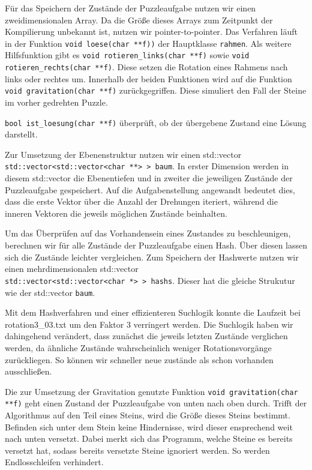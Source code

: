 	Für das Speichern der Zustände der Puzzleaufgabe nutzen wir einen zweidimensionalen Array.
	Da die Größe dieses Arrays zum Zeitpunkt der Kompilierung unbekannt ist, nutzen wir pointer-to-pointer.
	Das Verfahren läuft in der Funktion \texttt{void loese(char **f))} der Hauptklasse \texttt{rahmen}.
	Als weitere Hilfsfunktion gibt es \texttt{void rotieren\_links(char **f)} sowie \texttt{void rotieren\_rechts(char **f)}. Diese setzen die Rotation eines Rahmens nach links oder rechtes um.
	Innerhalb der beiden Funktionen wird auf die Funktion \texttt{void gravitation(char **f)} zurückgegriffen.
	Diese simuliert den Fall der Steine im vorher gedrehten Puzzle.
	
	\texttt{bool ist\_loesung(char **f)} überprüft, ob der übergebene Zustand eine Lösung darstellt.
	
	Zur Umsetzung der Ebenenstruktur nutzen wir einen std::vector \\\texttt{std::vector<std::vector<char **> > baum}.
	In erster Dimension werden in diesem std::vector die Ebenentiefen und in zweiter die jeweiligen Zustände der Puzzleaufgabe gespeichert. 
	Auf die Aufgabenstellung angewandt bedeutet dies, dass die erste Vektor über die Anzahl der Drehungen iteriert, während die inneren Vektoren die jeweils möglichen Zustände beinhalten.

	Um das Überprüfen auf das Vorhandensein eines Zustandes zu beschleunigen, berechnen wir für alle Zustände der Puzzleaufgabe einen Hash.
	Über diesen lassen sich  die Zustände leichter vergleichen. Zum Speichern der Hashwerte nutzen 
	wir einen mehrdimensionalen std::vector \\\texttt{std::vector<std::vector<char *> > hashs}. Dieser hat die gleiche Strukutur wie der std::vector \texttt{baum}.
	
	Mit dem Hashverfahren und einer effizienteren Suchlogik konnte die Laufzeit bei rotation3\_03.txt um den Faktor 3 verringert werden.
 	Die Suchlogik haben wir dahingehend verändert, dass zunächst die jeweils letzten Zustände verglichen werden, da ähnliche Zustände wahrscheinlich weniger Rotationsvorgänge zurückliegen. So können wir schneller neue zustände als schon vorhanden ausschließen.

	Die zur Umsetzung der Gravitation genutzte Funktion \texttt{void gravitation(char **f)} geht einen Zustand der Puzzleaufgabe von unten nach oben durch.
	Trifft der Algorithmus auf den Teil eines Steins, wird die Größe dieses Steins bestimmt. Befinden sich unter dem Stein keine Hindernisse, 
	wird dieser ensprechend weit nach unten versetzt. Dabei merkt sich das Programm, welche Steine es bereits versetzt hat, sodass bereits versetzte Steine ignoriert werden. So werden Endlosschleifen verhindert.
 
	
	
